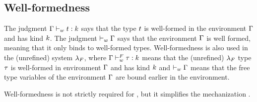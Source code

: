 \subsection{Well-formedness}
\label{sec:typing:wf}

%
The judgment ${\mathrm{\Gamma}} \vdash_w {t} : {k}$
says that the type $t$ is well-formed in the environment
$\mathrm{\Gamma}$ and has kind $k$.
%
The judgment $\vdash_w {\mathrm{\Gamma}}$ says that the
environment $\mathrm{\Gamma}$ is well formed, meaning
that it only binds to well-formed
types.
%
Well-formedness is also used in the (unrefined) system $\lambda_{F}$, where
${\mathrm{\Gamma}} \vdash_w^F {\tau} : {k}$
means that the (unrefined) $\lambda_{F}$ type
$\tau$ is well-formed in environment
$\mathrm{\Gamma}$ and has kind $k$
and $\vdash_w {\mathrm{\Gamma}}$ means
that the free type variables
of the
environment $\mathrm{\Gamma}$ are bound earlier in the environment.
%
\begin{fullversion}
Well-formedness is not strictly
required for \sysf, but it 
simplifies the mechanization \cite{Remy21}.
\end{fullversion}


